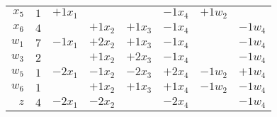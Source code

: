 \documentclass[12pt]{article}
\begin{document}
\begin{tabular}{r | r r r r r r r}
    $x_5$ & $1$ & $+1x_1$ &  &  & $-1x_4$ & $+1w_2$ &  \\
    $x_6$ & $4$ &  & $+1x_2$ & $+1x_3$ & $-1x_4$ &  & $-1w_4$ \\
    $w_1$ & $7$ & $-1x_1$ & $+2x_2$ & $+1x_3$ & $-1x_4$ &  & $-1w_4$ \\
    $w_3$ & $2$ &  & $+1x_2$ & $+2x_3$ & $-1x_4$ &  & $-1w_4$ \\
    $w_5$ & $1$ & $-2x_1$ & $-1x_2$ & $-2x_3$ & $+2x_4$ & $-1w_2$ & $+1w_4$ \\
    $w_6$ & $1$ &  & $+1x_2$ & $+1x_3$ & $+1x_4$ & $-1w_2$ & $-1w_4$ \\
    \hline
    $z$ & $4$ & $-2x_1$ & $-2x_2$ &  & $-2x_4$ &  & $-1w_4$ \\
\end{tabular}


\newpage
\end{document}
